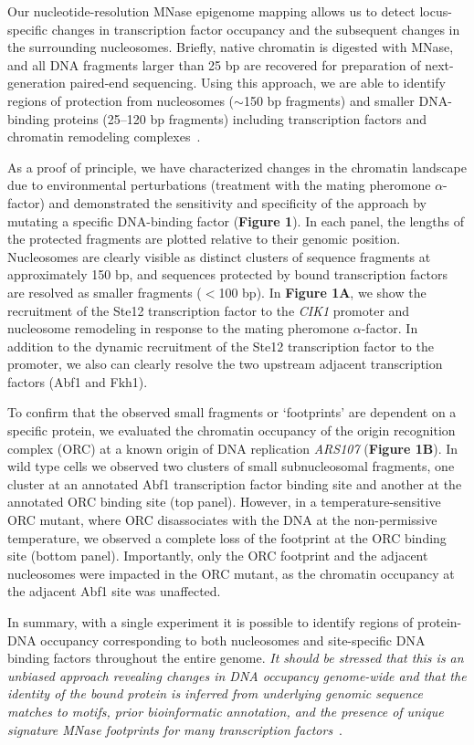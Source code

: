 \documentclass[11pt]{article}
\begin{document}
Our nucleotide-resolution MNase epigenome mapping allows us to detect locus-specific changes in transcription factor occupancy and the subsequent changes in the surrounding nucleosomes. Briefly, native chromatin is digested with MNase, and all DNA fragments larger than 25 bp are recovered for preparation of next-generation paired-end sequencing. Using this approach, we are able to identify regions of protection from nucleosomes ($\sim$150 bp fragments) and smaller DNA-binding proteins (25--120 bp fragments) including transcription factors and chromatin remodeling complexes~\citep{Henikoff2011}.

As a proof of principle, we have characterized changes in the chromatin landscape due to environmental perturbations (treatment with the mating pheromone $\alpha$-factor) and demonstrated the sensitivity and specificity of the approach by mutating a specific DNA-binding factor ({\bf \color{dukeblue}Figure 1}). In each panel, the lengths of the protected fragments are plotted relative to their genomic position.  Nucleosomes are clearly visible as distinct clusters of sequence fragments at approximately 150 bp, and sequences protected by bound transcription factors are resolved as smaller fragments ($<$100 bp).  In {\bf \color{dukeblue}Figure 1A}, we show the recruitment of  the Ste12 transcription factor to the \emph{CIK1} promoter and nucleosome remodeling  in response to the mating pheromone $\alpha$-factor.  In addition to the dynamic recruitment of the Ste12 transcription factor to the promoter, we also can clearly resolve the two upstream adjacent transcription factors (Abf1 and Fkh1).

To confirm that the observed small fragments or `footprints' are dependent on a specific  protein, we evaluated the chromatin occupancy of the origin recognition complex (ORC) at a known origin of DNA replication \emph{ARS107} ({\bf \color{dukeblue}Figure 1B}).  In wild type cells we observed two clusters of small subnucleosomal fragments, one cluster at an annotated Abf1 transcription factor binding site and another at the annotated ORC binding site (top panel).   However, in a temperature-sensitive ORC mutant, where ORC disassociates with the DNA at the non-permissive temperature, we observed a complete loss of the footprint at the ORC binding site (bottom panel).  Importantly, only the ORC footprint and the adjacent nucleosomes were impacted in the ORC mutant, as the chromatin occupancy at the adjacent Abf1 site was unaffected.

In summary, with a single experiment it is possible to identify regions of protein-DNA occupancy corresponding to both nucleosomes and site-specific DNA binding factors throughout the entire genome. \emph{\color{dukeblue}It should be stressed that this is an unbiased approach revealing changes in DNA occupancy genome-wide and that the identity of the bound protein is inferred from underlying genomic sequence matches to motifs, prior bioinformatic annotation, and the presence of unique signature MNase footprints for many transcription factors}~\citep{Henikoff2011}.
\end{document}

